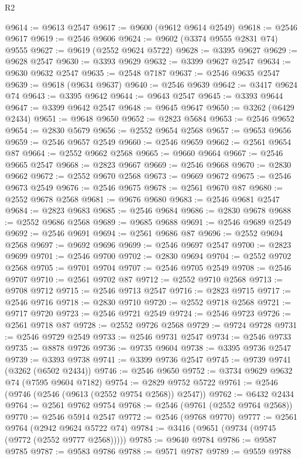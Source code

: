\begin{lexlean}{R2}
\begin{coremodule}
@9614 := @9613 @2547
@9617 := @9600 (@9612 @9614 @2549)
@9618 := @2546 @9617
@9619 := @2546 @9606
@9624 := @9602 (@3374 @9555 @2831 @74) @9555
@9627 := @9619 (@2552 @9624 @5722)
@9628 := @3395 @9627
@9629 := @9628 @2547
@9630 := @3393 @9629
@9632 := @3399 @9627 @2547
@9634 := @9630 @9632 @2547
@9635 := @2548 @7187
@9637 := @2546 @9635 @2547
@9639 := @9618 (@9634 @9637)
@9640 := @2546 @9639
@9642 := @3417 @9624 @74
@9643 := @3395 @9642
@9644 := @9643 @2547
@9645 := @3393 @9644
@9647 := @3399 @9642 @2547
@9648 := @9645 @9647
@9650 := @3262 (@6429 @2434)
@9651 := @9648 @9650
@9652 := @2823 @5684
@9653 := @2546 @9652
@9654 := @2830 @5679
@9656 := @2552 @9654 @2568
@9657 := @9653 @9656
@9659 := @2546 @9657 @2549
@9660 := @2546 @9659
@9662 := @2561 @9654 @87
@9664 := @2552 @9662 @2568
@9665 := @9660 @9664
@9667 := @2546 @9665 @2547
@9668 := @2823 @9667
@9669 := @2546 @9668
@9670 := @2830 @9662
@9672 := @2552 @9670 @2568
@9673 := @9669 @9672
@9675 := @2546 @9673 @2549
@9676 := @2546 @9675
@9678 := @2561 @9670 @87
@9680 := @2552 @9678 @2568
@9681 := @9676 @9680
@9683 := @2546 @9681 @2547
@9684 := @2823 @9683
@9685 := @2546 @9684
@9686 := @2830 @9678
@9688 := @2552 @9686 @2568
@9689 := @9685 @9688
@9691 := @2546 @9689 @2549
@9692 := @2546 @9691
@9694 := @2561 @9686 @87
@9696 := @2552 @9694 @2568
@9697 := @9692 @9696
@9699 := @2546 @9697 @2547
@9700 := @2823 @9699
@9701 := @2546 @9700
@9702 := @2830 @9694
@9704 := @2552 @9702 @2568
@9705 := @9701 @9704
@9707 := @2546 @9705 @2549
@9708 := @2546 @9707
@9710 := @2561 @9702 @87
@9712 := @2552 @9710 @2568
@9713 := @9708 @9712
@9715 := @2546 @9713 @2547
@9716 := @2823 @9715
@9717 := @2546 @9716
@9718 := @2830 @9710
@9720 := @2552 @9718 @2568
@9721 := @9717 @9720
@9723 := @2546 @9721 @2549
@9724 := @2546 @9723
@9726 := @2561 @9718 @87
@9728 := @2552 @9726 @2568
@9729 := @9724 @9728
@9731 := @2546 @9729 @2549
@9733 := @2546 @9731 @2547
@9734 := @2546 @9733
@9735 := @8878 @9726
@9736 := @9735 @9604
@9738 := @3395 @9736 @2547
@9739 := @3393 @9738
@9741 := @3399 @9736 @2547
@9745 := @9739 @9741 (@3262 (@6502 @2434))
@9746 := @2546 @9650
@9752 := @3734 @9629 @9632 @74 (@7595 @9604 @7182)
@9754 := @2829 @9752 @5722
@9761 := @2546 (@9746 (@2546 (@9613 (@2552 @9754 @2568)) @2547))
@9762 := @6432 @2434
@9764 := @2561 @9762 @9754
@9768 := @2546 (@9761 (@2552 @9764 @2568))
@9770 := @2546 @5914 @2547
@9772 := @2546 (@9768 @9770)
@9777 := @2561 @9764 (@2942 @9624 @5722 @74)
@9784 := @3416 (@9651 (@9734 (@9745 (@9772 (@2552 @9777 @2568)))))
@9785 := @9640 @9784
@9786 := @9587 @9785
@9787 := @9583 @9786
@9788 := @9571 @9787
@9789 := @9559 @9788

\end{coremodule}
\end{lexlean}
